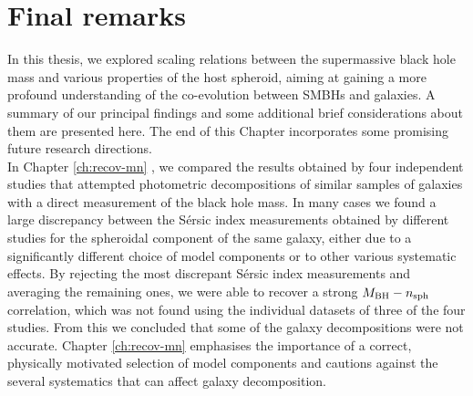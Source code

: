 \chapter{Final remarks}
\label{ch:concl}

In this thesis, we explored scaling relations between the supermassive black hole mass 
and various properties of the host spheroid, 
aiming at gaining a more profound understanding of the co-evolution between SMBHs and galaxies. 
A summary of our principal findings and some additional brief considerations about them are presented here. 
The end of this Chapter incorporates some promising future research directions. \\

In Chapter \ref{ch:recov-mn} \citep{savorgnan2013}, we compared the results obtained by four independent studies 
\citep{grahamdriver2007,sani2011,vika2012,beifiori2012}
that attempted photometric decompositions of similar samples of galaxies with a direct measurement 
of the black hole mass. 
In many cases we found a large discrepancy between the S\'ersic index measurements 
obtained by different studies for the spheroidal component of the same galaxy, 
either due to a significantly different choice of model components 
or to other various systematic effects. 
By rejecting the most discrepant S\'ersic index measurements and averaging the remaining ones, 
we were able to recover a strong $M_{\rm BH} - n_{\rm sph}$ correlation, 
which was not found using the individual datasets of three of the four studies. 
From this we concluded that some of the galaxy decompositions were not accurate. 
Chapter \ref{ch:recov-mn} emphasises the importance of a correct, physically motivated selection of model components 
and cautions against the several systematics that can affect galaxy decomposition. \\

